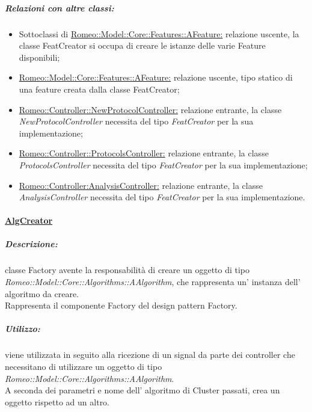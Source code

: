 			\subparagraph{Relazioni con altre classi:}
				\begin{itemize}
					\item Sottoclassi di \hyperref[features::features]{Romeo::Model::Core::Features::AFeature:} relazione uscente, la classe FeatCreator si occupa di creare le istanze delle varie Feature\g{} disponibili;
					
					\item \hyperref[AFeature]{Romeo::Model::Core::Features::AFeature:} relazione uscente, tipo statico di una feature\g{} creata dalla classe FeatCreator;
					
					\item \hyperref[]{Romeo::Controller::NewProtocolController:} relazione entrante, la classe \textsl{NewProtocolController} necessita del tipo \textsl{FeatCreator} per la sua implementazione;
					
					\item \hyperref[]{Romeo::Controller::ProtocolsController:} relazione entrante, la classe \textsl{ProtocolsController} necessita del tipo \textsl{FeatCreator} per la sua implementazione;
					
					\item \hyperref[]{Romeo::Controller:AnalysisController:} relazione entrante, la classe \textsl{AnalysisController} necessita del tipo \textsl{FeatCreator} per la sua implementazione.
				\end{itemize}
		
		\paragraph{\underline{AlgCreator}} 
		\label{algC}
			
			\subparagraph{Descrizione:} classe Factory avente la responsabilità di creare un oggetto di tipo \textsl{Romeo::Model::Core::Algorithms::AAlgorithm}, che rappresenta un' instanza dell' algoritmo da creare.
			\\Rappresenta il componente Factory del design pattern\g{} Factory.
			
			\subparagraph{Utilizzo:} viene utilizzata in seguito alla ricezione di un signal\g{} da parte dei controller che necessitano di utilizzare un oggetto di tipo \textsl{Romeo::Model::Core::Algorithms::AAlgorithm}.
			\\A seconda dei parametri e nome dell’ algoritmo di Cluster\g{} passati, crea un oggetto rispetto ad un altro.
			

